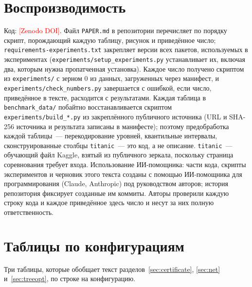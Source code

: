 \documentclass[11pt]{article}
\newcommand{\todo}[1]{\textcolor{red}{[#1]}}
\begin{document}
\section{Воспроизводимость}
Код: \todo{Zenodo DOI}. Файл \texttt{PAPER.md} в репозитории перечисляет по порядку скрипт, порождающий каждую таблицу, рисунок и приведённое число; \texttt{requirements-experiments.txt} закрепляет версии всех пакетов, используемых в экспериментах (\texttt{experiments/setup\_experiments.py} устанавливает их, включая два, которым нужна пропатченная установка). Каждое число получено скриптом из \texttt{experiments/} с зерном 0 из данных, загруженных через манифест, и \texttt{experiments/check\_numbers.py} завершается с ошибкой, если число, приведённое в тексте, расходится с результатами. Каждая таблица в \texttt{benchmark\_data/} побайтно восстанавливается скриптом \texttt{experiments/build\_*.py} из закреплённого публичного источника (URL и SHA-256 источника и результата записаны в манифесте); поэтому предобработка каждой таблицы~--- перекодирование уровней, квантильные интервалы, сконструированные столбцы \texttt{titanic}~--- это код, а не описание. \texttt{titanic}~--- обучающий файл Kaggle, взятый из публичного зеркала, поскольку страница соревнования требует входа. Использование ИИ-помощника: части кода, скрипты экспериментов и черновик этого текста созданы с помощью ИИ-помощника для программирования (Claude, Anthropic) под руководством авторов; история репозитория фиксирует созданные им коммиты. Авторы проверили каждую строку кода и каждое приведённое здесь число и несут за них полную ответственность.


\appendix
\section{Таблицы по конфигурациям}\label{app:tables}
Три таблицы, которые обобщает текст разделов~\ref{sec:certificate}, \ref{sec:net} и~\ref{sec:treeopt}, по строке на конфигурацию.

\begin{table}[p]\centering\footnotesize\setlength{\tabcolsep}{3.5pt}
\caption{Семейный сертификат против разбиения на исследовательскую и контрольную части на тех же фолдах: покрытие на отложенных строках (пункты) при $B=32$ и, для частичных центров, доля разбиений ($\ge\tau$), в которых чистота объединения на отложенных строках достигает $\tau$. «--»: ни один метод не достигает $1\,\%$ покрытия на отложенных строках по этому правилу, так что конфигурация неинформативна и исключена из парного сравнения. У четырёх конфигураций, неинформативных по обоим правилам (\texttt{car}, \texttt{resume}, \texttt{breast\_cancer}, \texttt{splice}), строки нет. У набора данных, запущенного для двух целевых значений или двух порогов размера, целевое значение или $m$ указаны в скобках~--- здесь и во всех таблицах ниже. Получено \texttt{experiments/paper\_tables.py}.}\label{tab:split}

\end{table}
\end{document}
